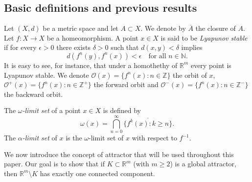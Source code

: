 \documentclass{amsart}
\newtheorem{lemma}{Lemma}
\newcommand{\R}{{\mathbb{R}}}
\newcommand{\Z}{{\mathbb{Z}}}
\newcommand{\N}{{\mathbb{N}}}
\begin{document}
	\subsection{Basic definitions and previous results}
	
	Let $(X,d)$ be a metric space and let $A\subset X$. We denote by $\overline{A}$ the closure of $A$.  
	Let $f:X\to X$ be a homeomorphism. A point $x\in X$ is said to be \emph{Lyapunov stable} if for every $\epsilon>0$ there exists $\delta>0$ such that $d(x,y)<\delta$ implies 
	\[
	d(f^n(y), f^n(x))<\epsilon \quad \text{for all } n\in\N.
	\]
	It is easy to see, for instance, that under a homothethy of $\R^m$ every point is Lyapunov stable. We denote $\mathcal{O}(x)=\{f^n(x): n\in \Z\}$ the orbit of $x$, $\mathcal{O}^+(x)=\{f^n(x): n\in \Z^+\}$ the forward orbit and $\mathcal{O}^-(x)=\{f^n(x): n\in \Z^-\}$ the backward orbit.
	
	The \emph{$\omega$-limit set} of a point $x\in X$ is defined by
	\[
	\omega(x)=\bigcap_{n=0}^\infty \overline{\{f^k(x): k\geq n\}}.
	\]
	The \emph{$\alpha$-limit set} of $x$ is the $\omega$-limit set of $x$ with respect to $f^{-1}$.
	
	
	
	
	We now introduce the concept of attractor that will be used throughout this paper. Our goal is to show that if $K\subset \R^m$ (with $m\geq2$) is a global attractor, then $\R^m\setminus K$ has exactly one connected component.
	
\end{document}
